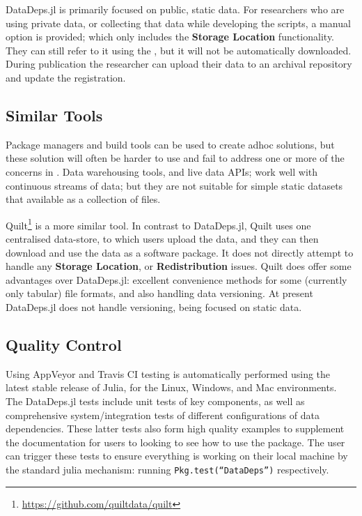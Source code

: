 \documentclass{book}
\begin{document}
\noindent DataDeps.jl is primarily focused on public, static data.
For researchers who are using private data, or collecting that data while developing the scripts, a manual option is provided; which only includes the \textbf{Storage Location} functionality. They can still refer to it using the , but it will not be automatically downloaded.
During publication the researcher can upload their data to an archival repository and update the registration.



\subsection{Similar Tools}
Package managers and build tools can be used to create adhoc solutions, but these solution will often be harder to use and fail to address one or more of the concerns in .
Data warehousing tools, and live data APIs; work well with continuous streams of data;
but they are not suitable for simple static datasets that available as a collection of files.


Quilt\footnote{\url{https://github.com/quiltdata/quilt}} is a more similar tool.
In contrast to DataDeps.jl, Quilt uses one centralised data-store, to which users upload the data, and they can then download and use the data as a software package.
It does not directly attempt to handle any \textbf{Storage Location}, or \textbf{Redistribution} issues.
%
Quilt does offer some advantages over DataDeps.jl:
excellent convenience methods for some (currently only tabular) file formats, 
and also handling data versioning.
At present DataDeps.jl does not handle versioning, being focused on static data.


\subsection{Quality Control}

Using AppVeyor and Travis CI testing is automatically performed using the latest stable release of Julia, for the Linux, Windows, and Mac environments.
The DataDeps.jl tests include unit tests of key components, as well as comprehensive system/integration tests of different configurations of data dependencies.
These latter tests also form high quality examples to supplement the documentation for users to looking to see how to use the package.
The user can trigger these tests to ensure everything is working on their local machine by the standard julia mechanism: running \texttt{Pkg.test(``DataDeps'')} respectively.
\end{document}
